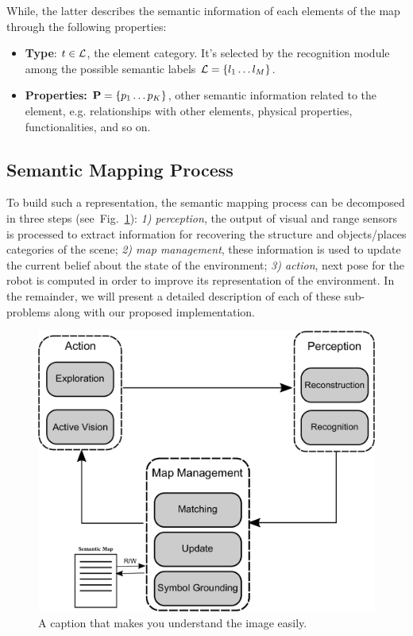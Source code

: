 \documentclass[letterpaper, 10 pt, conference]{ieeeconf}  %
\def\figref#1{Fig.~\ref{#1}}
\begin{document}
While, the latter describes the semantic information of each elements of the map through the following properties:
\begin{itemize}
	\item {\bf Type}: $t \in \mathcal{L}$, the element category. It's selected by the recognition module among the possible semantic labels $\mathcal{L} = \{l_1 \dots l_M \}$.
	\item {\bf Properties:} $\mathbf{P} = \{ p_1 \dots p_K \}$, other semantic information related to the element, e.g. relationships with other elements, physical properties, functionalities, and so on. 
\end{itemize}   

\subsection{Semantic Mapping Process}

To build such a representation, the semantic mapping process can be decomposed in three steps (see~\figref{fig:system}): \emph{1) perception}, the output of visual and range sensors is processed to extract information for recovering the structure and objects/places categories of the scene; \emph{2) map management}, these information is used to update the current belief about the state of the environment; \emph{3) action}, next pose for the robot is computed in order to improve its representation of the environment. In the remainder, we will present a detailed description of each of these sub-problems along with our proposed implementation.

\begin{figure}[ht]
	\centering
	\includegraphics[width=0.99\columnwidth]{pics/drawing-crop}
	\caption{A caption that makes you understand the image easily.}
	\label{fig:system}
\end{figure}
\end{document}
